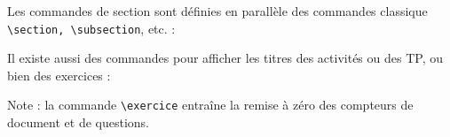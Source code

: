 

\addtocounter{part}{-1}
\addtocounter{section}{-1}
Les commandes de section sont définies en parallèle des commandes classique \lstinline|\section, \subsection|, etc. :
\begin{boiteCodeTex}{}


\end{boiteCodeTex}

Il existe aussi des commandes pour afficher les titres des activités ou des TP, ou bien des exercices :
\begin{boiteCodeTex}{}

\end{boiteCodeTex}
Note : la commande \lstinline|\exercice| entraîne la remise à zéro des compteurs de document et de questions.


